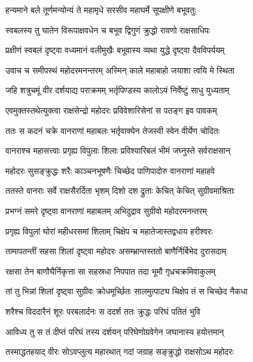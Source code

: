 
\twolineshloka
{हन्यमाने बले तूर्णमन्योन्यं ते महामृधे}
{सरसीव महाघर्मे सूपक्षीणे बभूवतुः} %

\twolineshloka
{स्वबलस्य तु घातेन विरूपाक्षवधेन च}
{बभूव द्विगुणं क्रुद्धो रावणो राक्षसाधिपः} %

\twolineshloka
{प्रक्षीणं स्वबलं दृष्ट्वा वध्यमानं वलीमुखैः}
{बभूवास्य व्यथा युद्धे दृष्ट्वा दैवविपर्ययम्} %

\twolineshloka
{उवाच च समीपस्थं महोदरमनन्तरम्}
{अस्मिन् काले महाबाहो जयाशा त्वयि मे स्थिता} %

\twolineshloka
{जहि शत्रुचमूं वीर दर्शयाद्य पराक्रमम्}
{भर्तृपिण्डस्य कालोऽयं निर्वेष्टुं साधु युध्यताम्} %

\twolineshloka
{एवमुक्तस्तथेत्युक्त्वा राक्षसेन्द्रो महोदरः}
{प्रविवेशारिसेनां स पतङ्ग इव पावकम्} %

\twolineshloka
{ततः स कदनं चक्रे वानराणां महाबलः}
{भर्तृवाक्येन तेजस्वी स्वेन वीर्येण चोदितः} %

\twolineshloka
{वानराश्च महासत्त्वाः प्रगृह्य विपुलाः शिलाः}
{प्रविश्यारिबलं भीमं जघ्नुस्ते सर्वराक्षसान्} %

\twolineshloka
{महोदरः सुसङ्क्रुद्धः शरैः काञ्चनभूषणैः}
{चिच्छेद पाणिपादोरु वानराणां महाहवे} %

\twolineshloka
{ततस्ते वानराः सर्वे राक्षसैरर्दिता भृशम्}
{दिशो दश द्रुताः केचित् केचित् सुग्रीवमाश्रिताः} %

\twolineshloka
{प्रभग्नं समरे दृष्ट्वा वानराणां महाबलम्}
{अभिदुद्राव सुग्रीवो महोदरमनन्तरम्} %

\twolineshloka
{प्रगृह्य विपुलां घोरां महीधरसमां शिलाम्}
{चिक्षेप च महातेजास्तद्वधाय हरीश्वरः} %

\twolineshloka
{तामापतन्तीं सहसा शिलां दृष्ट्वा महोदरः}
{असम्भ्रान्तस्ततो बाणैर्निर्बिभेद दुरासदाम्} %

\twolineshloka
{रक्षसा तेन बाणौघैर्निकृत्ता सा सहस्रधा}
{निपपात तदा भूमौ गृध्रचक्रमिवाकुलम्} %

\twolineshloka
{तां तु भिन्नां शिलां दृष्ट्वा सुग्रीवः क्रोधमूर्च्छितः}
{सालमुत्पाट्य चिक्षेप तं स चिच्छेद नैकधा} %

\twolineshloka
{शरैश्च विददारैनं शूरः परबलार्दनः}
{स ददर्श ततः क्रुद्धः परिघं पतितं भुवि} %

\twolineshloka
{आविध्य तु स तं दीप्तं परिघं तस्य दर्शयन्}
{परिघेणोग्रवेगेन जघानास्य हयोत्तमान्} %

\twolineshloka
{तस्माद्धतहयाद् वीरः सोऽवप्लुत्य महारथात्}
{गदां जग्राह सङ्क्रुद्धो राक्षसोऽथ महोदरः} %

